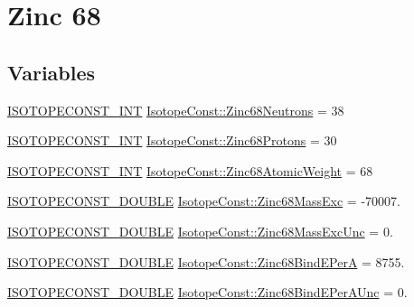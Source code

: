 \hypertarget{group___isotope_const-_zinc-_zn68}{}\section{Zinc 68}
\label{group___isotope_const-_zinc-_zn68}
\subsection*{Variables}
\begin{DoxyCompactItemize}
\item 
\mbox{\hyperlink{group___isotope_const-_macros_ga5f18360b3e99483a35c32d789e62621c}{I\+S\+O\+T\+O\+P\+E\+C\+O\+N\+S\+T\+\_\+\+I\+NT}} \mbox{\hyperlink{group___isotope_const-_zinc-_zn68_gadd499c293eb24eb68d8f73e99e899edc}{Isotope\+Const\+::\+Zinc68\+Neutrons}} = 38
\item 
\mbox{\hyperlink{group___isotope_const-_macros_ga5f18360b3e99483a35c32d789e62621c}{I\+S\+O\+T\+O\+P\+E\+C\+O\+N\+S\+T\+\_\+\+I\+NT}} \mbox{\hyperlink{group___isotope_const-_zinc-_zn68_gac758fe24f7d665b3745768df642eba96}{Isotope\+Const\+::\+Zinc68\+Protons}} = 30
\item 
\mbox{\hyperlink{group___isotope_const-_macros_ga5f18360b3e99483a35c32d789e62621c}{I\+S\+O\+T\+O\+P\+E\+C\+O\+N\+S\+T\+\_\+\+I\+NT}} \mbox{\hyperlink{group___isotope_const-_zinc-_zn68_gae20e216f2e1473d3dc6344dc316ce099}{Isotope\+Const\+::\+Zinc68\+Atomic\+Weight}} = 68
\item 
\mbox{\hyperlink{group___isotope_const-_macros_ga8f45a7272ce02c0b4c65c44636ed719a}{I\+S\+O\+T\+O\+P\+E\+C\+O\+N\+S\+T\+\_\+\+D\+O\+U\+B\+LE}} \mbox{\hyperlink{group___isotope_const-_zinc-_zn68_ga3e95955d16e8d490eff433e8cdfdcff9}{Isotope\+Const\+::\+Zinc68\+Mass\+Exc}} = -\/70007.
\item 
\mbox{\hyperlink{group___isotope_const-_macros_ga8f45a7272ce02c0b4c65c44636ed719a}{I\+S\+O\+T\+O\+P\+E\+C\+O\+N\+S\+T\+\_\+\+D\+O\+U\+B\+LE}} \mbox{\hyperlink{group___isotope_const-_zinc-_zn68_ga33f4fe8481223e0fe535feb3f9d61e3e}{Isotope\+Const\+::\+Zinc68\+Mass\+Exc\+Unc}} = 0.
\item 
\mbox{\hyperlink{group___isotope_const-_macros_ga8f45a7272ce02c0b4c65c44636ed719a}{I\+S\+O\+T\+O\+P\+E\+C\+O\+N\+S\+T\+\_\+\+D\+O\+U\+B\+LE}} \mbox{\hyperlink{group___isotope_const-_zinc-_zn68_ga0b900079262ca53709317b2db9317b9e}{Isotope\+Const\+::\+Zinc68\+Bind\+E\+PerA}} = 8755.
\item 
\mbox{\hyperlink{group___isotope_const-_macros_ga8f45a7272ce02c0b4c65c44636ed719a}{I\+S\+O\+T\+O\+P\+E\+C\+O\+N\+S\+T\+\_\+\+D\+O\+U\+B\+LE}} \mbox{\hyperlink{group___isotope_const-_zinc-_zn68_ga4bc280f9d8d37736040c81feb5f9564f}{Isotope\+Const\+::\+Zinc68\+Bind\+E\+Per\+A\+Unc}} = 0.

\end{DoxyCompactItemize}
